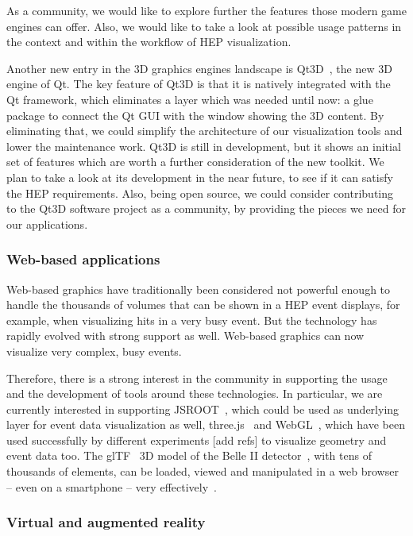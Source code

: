 \documentclass[12pt,a4paper]{article}
\begin{document}
As a community, we would like to explore further the features those modern game engines can offer. Also, we would like to take a
look at possible usage patterns in the context and within the workflow of HEP visualization.

Another new entry in the 3D graphics engines landscape is Qt3D~\cite{Qt3d},  the new 3D engine of Qt. The key feature of
Qt3D is that it is natively integrated with the Qt framework, which eliminates a layer which was needed until now: a glue
package to connect the Qt GUI with the window showing the 3D content. By eliminating that, we could simplify the architecture
of our visualization tools and lower the maintenance work. Qt3D is still in development, but it shows an initial set of
features which are worth a further consideration of the new toolkit. We plan to take a look at its development in the near future,
to see if it can satisfy the HEP requirements. Also, being open source, we could consider contributing to the Qt3D software
project as a community, by providing the pieces we need for our applications.

\hypertarget{web-based}{%
\subsubsection{Web-based applications}\label{web-based}}

Web-based graphics have traditionally been considered not powerful enough to handle the thousands of volumes that can be
shown in a HEP event displays, for example, when visualizing hits in a very busy event. But the technology has rapidly
evolved with strong support as well. Web-based graphics can now visualize very complex, busy events.

Therefore, there is a strong interest in the community in supporting the usage and the development of tools around
these technologies. In particular, we are currently interested in supporting JSROOT~\cite{rootjs}, which could be used as
underlying layer for event data visualization as well, three.js~\cite{ThreeJS} and WebGL~\cite{WebGL2011}, which have been
used successfully by different experiments [add refs] to visualize geometry and event data too. The glTF~\cite{glTF} 3D model
of the Belle II detector~\cite{BelleII}, with tens of thousands of elements, can be loaded, viewed and manipulated in a web
browser – even on a smartphone – very effectively~\cite{SketchFabBelleII}.

\hypertarget{vr}{%
\subsubsection{Virtual and augmented reality}\label{vr}}
\end{document}
